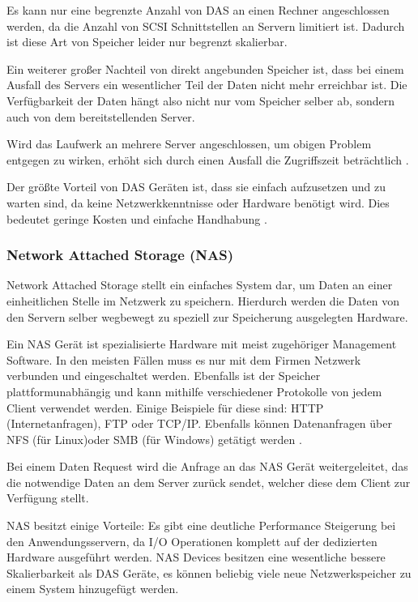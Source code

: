 Es kann nur eine begrenzte Anzahl von DAS an einen Rechner angeschlossen werden, da die Anzahl von SCSI Schnittstellen an Servern limitiert ist. Dadurch ist diese Art von Speicher leider nur begrenzt skalierbar.

Ein weiterer großer Nachteil von direkt angebunden Speicher ist, dass bei einem Ausfall des Servers ein wesentlicher Teil der Daten nicht mehr erreichbar ist. Die Verfügbarkeit der Daten hängt also nicht nur vom Speicher selber ab, sondern auch von dem bereitstellenden Server.

Wird das Laufwerk an mehrere Server angeschlossen, um obigen Problem entgegen zu wirken, erhöht sich durch einen Ausfall die Zugriffszeit beträchtlich \parencite[Kap. 1, Disk Storage Systems]{gupta.2002}.

Der größte Vorteil von DAS Geräten ist, dass sie einfach aufzusetzen und zu warten sind, da keine Netzwerkkenntnisse oder Hardware benötigt wird. Dies bedeutet geringe Kosten und einfache Handhabung \parencite{beal.2017}.

\subsubsection{Network Attached Storage (NAS)}

Network Attached Storage stellt ein einfaches System dar, um Daten an einer einheitlichen Stelle im Netzwerk zu speichern. Hierdurch werden die Daten von den Servern selber wegbewegt zu speziell zur Speicherung ausgelegten Hardware. 

Ein NAS Gerät ist spezialisierte Hardware mit meist zugehöriger Management Software. In den meisten Fällen muss es nur mit dem Firmen Netzwerk verbunden und eingeschaltet werden. Ebenfalls ist der Speicher plattformunabhängig und kann mithilfe verschiedener Protokolle von jedem Client verwendet werden. Einige Beispiele für diese sind: HTTP (Internetanfragen), FTP oder TCP/IP. Ebenfalls können Datenanfragen über NFS (für Linux)oder SMB (für Windows) getätigt werden \parencite[Kap. 1, NAS Devices]{gupta.2002}.

Bei einem Daten Request wird die Anfrage an das NAS Gerät weitergeleitet, das die notwendige Daten an dem Server zurück sendet, welcher diese dem Client zur Verfügung stellt.

NAS besitzt einige Vorteile: Es gibt eine deutliche Performance Steigerung bei den Anwendungsservern, da I/O Operationen komplett auf der dedizierten Hardware ausgeführt werden. NAS Devices besitzen eine wesentliche bessere Skalierbarkeit als DAS Geräte, es können beliebig viele neue Netzwerkspeicher zu einem System hinzugefügt werden.

